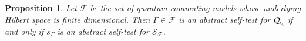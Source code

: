 \documentclass[11pt]{amsart}
\newtheorem{proposition}[theorem]{Proposition}
\theoremstyle{definition}
\newcommand\nph{\varphi}
\newcommand{\cl}[1]{\mathcal{#1}}
\newcommand{\bb}[1]{\mathbb{#1}}
\begin{document}

\begin{proposition}\label{p_cqcste}
Let $\cl F$ be the set of quantum commuting models whose 
underlying Hilbert space is finite dimensional. 
Then $\Gamma\in \tilde{\cl F}$
is an abstract self-test for $\cl Q_{\rm q}$ if and only if 
$s_{\Gamma}$ is an abstract self-test for $\cl S_{\cl F}$.
\end{proposition}
\end{document}
